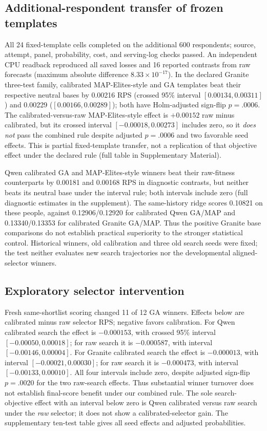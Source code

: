 \documentclass[sigconf,anonymous]{aamas}
\begin{document}
\subsection{Additional-respondent transfer of frozen templates}
All 24 fixed-template cells completed on the additional 600 respondents;
source, attempt, panel, probability, cost, and serving-log checks passed.
An independent CPU readback reproduced all saved losses and 16 reported
contrasts from raw forecasts (maximum absolute difference $8.33\times10^{-17}$).
In the declared Granite three-test family, calibrated MAP-Elites-style and GA
templates beat their respective neutral bases by 0.00216 RPS (crossed 95\%
interval $[0.00134,0.00311]$) and 0.00229 ($[0.00166,0.00289]$); both have
Holm-adjusted sign-flip $p=.0006$. The calibrated-versus-raw MAP-Elites-style
effect is $+0.00152$ raw minus calibrated, but its crossed interval
$[-0.00018,0.00273]$ includes zero, so it \emph{does not} pass the combined
rule despite adjusted $p=.0006$ and two favorable seed effects. This is
partial fixed-template transfer, not a replication of that objective effect
under the declared rule (full table in Supplementary Material).

Qwen calibrated GA and MAP-Elites-style winners beat their raw-fitness
counterparts by 0.00181 and 0.00168 RPS in diagnostic contrasts, but neither
beats its neutral base under the interval rule; both intervals include zero
(full diagnostic estimates in the supplement). The same-history
ridge scores 0.10821 on these people, against 0.12906/0.12920 for calibrated
Qwen GA/MAP and 0.13340/0.13353 for calibrated Granite GA/MAP. Thus the
positive Granite base comparisons do not establish practical superiority to
the stronger statistical control. Historical winners, old calibration and
three old search seeds were fixed; the test neither evaluates new search
trajectories nor the developmental aligned-selector winners.

\subsection{Exploratory selector intervention}
Fresh same-shortlist scoring changed 11 of 12 GA winners. Effects below
are calibrated minus raw selector RPS; negative favors calibration.
For Qwen calibrated search the effect is $-0.000153$, with crossed 95\%
interval $[-0.00050,0.00018]$; for raw search it is $-0.000587$,
with interval $[-0.00146,0.00004]$.
For Granite calibrated search the effect is $-0.000013$, with interval
$[-0.00021,0.00030]$; for raw search it is $-0.000473$, with interval
$[-0.00133,0.00010]$.
All four intervals include zero,
despite adjusted sign-flip $p=.0020$ for the two raw-search effects. Thus
substantial winner turnover does not establish final-score benefit under our
combined rule. The sole search-objective effect with an interval below zero
is Qwen calibrated versus raw search under the \emph{raw} selector; it does
not show a calibrated-selector gain. The supplementary ten-test table gives
all seed effects and adjusted probabilities.
\end{document}
